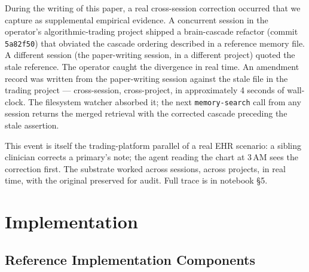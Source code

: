 \documentclass[runningheads]{llncs}
\begin{document}
During the writing of this paper, a real cross-session correction
occurred that we capture as supplemental empirical evidence. A
concurrent session in the operator's algorithmic-trading project
shipped a brain-cascade refactor (commit \texttt{5a82f50}) that
obviated the cascade ordering described in a reference memory file.
A different session (the paper-writing session, in a different
project) quoted the stale reference. The operator caught the
divergence in real time. An amendment record was written from the
paper-writing session against the stale file in the trading project
--- cross-session, cross-project, in approximately 4 seconds of
wall-clock. The filesystem watcher absorbed it; the next
\texttt{memory-search} call from any session returns the merged
retrieval with the corrected cascade preceding the stale assertion.

This event is itself the trading-platform parallel of a real EHR
scenario: a sibling clinician corrects a primary's note; the agent
reading the chart at 3\,AM sees the correction first. The substrate
worked across sessions, across projects, in real time, with the
original preserved for audit. Full trace is in notebook \S5.

\section{Implementation}
\label{sec:implementation}

\subsection{Reference Implementation Components}
\end{document}

